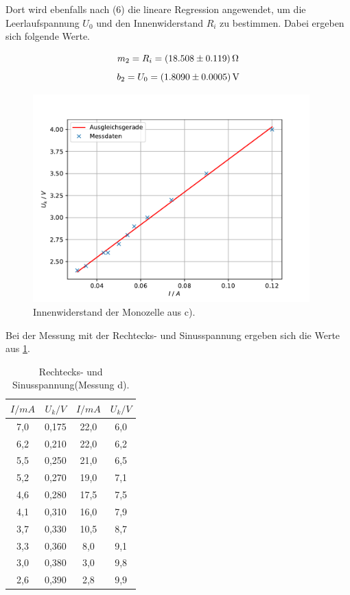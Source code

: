 Dort wird ebenfalls nach (6) die lineare Regression angewendet, um die Leerlaufspannung $U_0$ und den Innenwiderstand $R_i$ zu bestimmen.
Dabei ergeben sich folgende Werte.

\begin{equation}
    m_2 = R_i = \SI{18,508 \pm 0,119}{\Omega} \notag
\end{equation}
\begin{equation}
    b_2 = U_0 = \SI{1,809 \pm 0,0005}{V} \notag
\end{equation}

\begin{figure}[h]
  \centering
  \includegraphics[height=8cm]{Auswertung/C_Innenwiderstand.pdf}
  \caption{Innenwiderstand der Monozelle aus c).}
  \label{fig:C_Innenwiderstand.pdf}
\end{figure}

Bei der Messung mit der Rechtecks- und Sinusspannung ergeben sich die Werte aus \ref{tab:d}.
\begin{table}[h!]
    \begin{center}
      \caption{Rechtecks- und Sinusspannung(Messung d).}
      \label{tab:d}
      \begin{tabular}{c|c|c|c} 
        \textbf{$I / mA$} & \textbf{$U_k / V$} & \textbf{$I / mA$} &  \textbf{$U_k / V$}\\
        \hline
        7,0 & 0,175 & 22,0 & 6,0\\
		6,2 & 0,210 & 22,0 & 6,2\\
		5,5 & 0,250 & 21,0 & 6,5\\
		5,2 & 0,270 & 19,0 & 7,1\\
		4,6 & 0,280 & 17,5 & 7,5\\
		4,1 & 0,310 & 16,0 & 7,9\\
		3,7 & 0,330 & 10,5 & 8,7\\
		3,3 & 0,360 & 8,0 & 9,1\\
        3,0 & 0,380 & 3,0 & 9,8\\
        2,6 & 0,390 & 2,8 & 9,9\\
      \end{tabular}
    \end{center}
\end{table}


